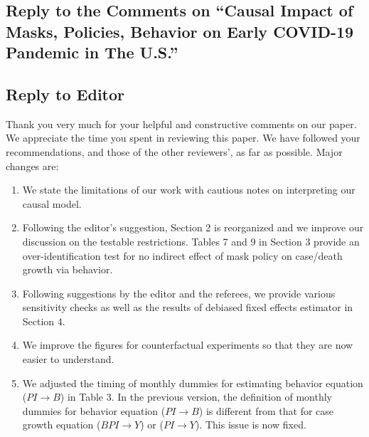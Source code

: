 \documentclass[11pt]{article}
\begin{document}
\newcommand{\replytitle}
{
\subsection*{Reply to the Comments on  ``Causal Impact of Masks, Policies, Behavior on Early COVID-19 Pandemic in The U.S.''}
}

\newcommand{\refreplyheading}
{Thank you very much for your helpful and constructive comments on our paper. We appreciate the time you spent in reviewing this paper. We have followed your recommendations, and those of the other reviewers', as far as possible.
Major changes are:}
 

\newcommand{\changes}
{
\begin{enumerate}

\item   We  state the limitations of our work with cautious notes on interpreting our causal model.
\item   Following the editor's suggestion, Section 2 is reorganized and we improve our discussion on the testable restrictions. Tables 7 and 9 in Section 3 provide   an  over-identification test for no indirect effect of mask policy on case/death growth via behavior.
\item   Following suggestions by the editor and the referees, we provide various sensitivity checks as well as the results of debiased fixed effects estimator  in Section 4.
\item   We improve the figures for counterfactual experiments so that they are now easier to understand. 
\item  We adjusted the timing of monthly dummies for estimating behavior equation ($PI \to B$)  in Table 3.  In the previous version, the definition of monthly dummies for behavior equation ($PI \to B$) is different from that for case growth equation ($BPI \to Y$)  or ($PI \to Y$). This issue is now fixed.
\end{enumerate}

}

\replytitle
\subsection*{Reply to Editor}
\refreplyheading
 
\changes
\end{document}
